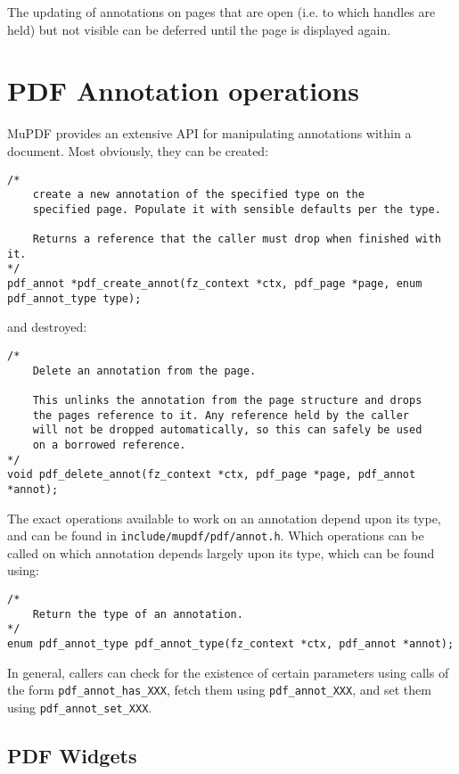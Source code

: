 \documentclass[oneside]{book}
\begin{document}
The updating of annotations on pages that are open (i.e. to which handles are held) but not visible can be deferred until the page is displayed again.

\section{PDF Annotation operations}

MuPDF provides an extensive API for manipulating annotations within a document. Most obviously, they can be created:

\begin{lstlisting}
/*
	create a new annotation of the specified type on the
	specified page. Populate it with sensible defaults per the type.

	Returns a reference that the caller must drop when finished with it.
*/
pdf_annot *pdf_create_annot(fz_context *ctx, pdf_page *page, enum pdf_annot_type type);
\end{lstlisting}

and destroyed:

\begin{lstlisting}
/*
	Delete an annotation from the page.

	This unlinks the annotation from the page structure and drops
	the pages reference to it. Any reference held by the caller
	will not be dropped automatically, so this can safely be used
	on a borrowed reference.
*/
void pdf_delete_annot(fz_context *ctx, pdf_page *page, pdf_annot *annot);
\end{lstlisting}

The exact operations available to work on an annotation depend upon its type, and can be found in \texttt{include/mupdf/pdf/annot.h}. Which operations can be called on which annotation depends largely upon its type, which can be found using:

\begin{lstlisting}
/*
	Return the type of an annotation.
*/
enum pdf_annot_type pdf_annot_type(fz_context *ctx, pdf_annot *annot);
\end{lstlisting}

In general, callers can check for the existence of certain parameters using calls of the form \texttt{pdf\_annot\_has\_XXX}, fetch them using \texttt{pdf\_annot\_XXX}, and set them using \texttt{pdf\_annot\_set\_XXX}.

\subsection{PDF Widgets}
\label{Widgets}
\end{document}
